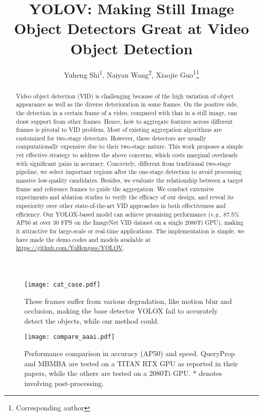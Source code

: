 \documentclass[letterpaper]{article} \usepackage{aaai23}  \usepackage{times}  \usepackage{helvet}  \usepackage{courier}  \usepackage[hyphens]{url}  \usepackage{graphicx} \urlstyle{rm} \def\UrlFont{\rm}  \usepackage{natbib}  \usepackage{caption} \usepackage{xcolor}
\title{YOLOV: Making Still Image Object Detectors Great at Video Object Detection}
\author {
Yuheng Shi\textsuperscript{\rm 1},
    Naiyan Wang\textsuperscript{\rm 2},
    Xiaojie Guo\textsuperscript{\rm 1}\thanks{Corresponding author}
}
\begin{document}
\maketitle

\begin{abstract}
Video object detection (VID) is challenging because of the high variation of object appearance as well as the diverse deterioration in some frames. On the positive side, the detection in a certain frame of a video, compared with that in a still image, can draw support from other frames. Hence, how to aggregate features across different frames is pivotal to VID problem. Most of existing aggregation algorithms are customized for two-stage detectors. However, these detectors are usually computationally expensive due to their two-stage nature. This work proposes a simple yet effective strategy to address the above concerns, which costs marginal overheads with significant gains in accuracy. Concretely, different from traditional two-stage pipeline, we select important regions after the one-stage detection to avoid processing massive low-quality candidates. Besides, we evaluate the relationship between a target frame and reference frames to guide the aggregation. We conduct extensive experiments and ablation studies to verify the efficacy of our design, and reveal its superiority over other state-of-the-art VID approaches in both effectiveness and efficiency. Our YOLOX-based model can achieve promising performance (\emph{e.g.}, 87.5\% AP50 at over 30 FPS on the ImageNet VID dataset on a single 2080Ti GPU), making it attractive for large-scale or real-time applications. The implementation is simple, we have made the demo codes and models available at \url{https://github.com/YuHengsss/YOLOV}.
\end{abstract}

\begin{figure}[!ht]
\centering
\texttt{[image: cat\_case.pdf]}
\caption{These frames suffer from various degradation, like motion blur and occlusion, making the base detector YOLOX fail to accurately detect the objects, while our method could.}
\label{fig:cat_case}

\centering
\texttt{[image: compare\_aaai.pdf]}
\caption{Performance comparison in accuracy (AP50) and speed. QueryProp and MBMBA are tested on a TITAN RTX GPU as reported in their papers, while the others are tested on a 2080Ti GPU. $*$ denotes involving post-processing.}
\label{fig:performance}
\end{figure}
\end{document}
